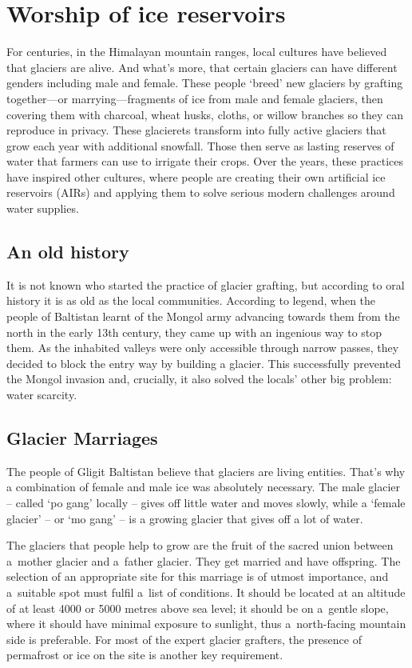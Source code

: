 \chapter{Worship of ice reservoirs}

For centuries, in the Himalayan mountain ranges, local cultures have believed that glaciers are alive. And
what’s more, that certain glaciers can have different genders including male and female. These people ‘breed’
new glaciers by grafting together—or marrying—fragments of ice from male and female glaciers, then covering them
with charcoal, wheat husks, cloths, or willow branches so they can reproduce in privacy. These glacierets
transform into fully active glaciers that grow each year with additional snowfall. Those then serve as lasting
reserves of water that farmers can use to irrigate their crops. Over the years, these practices have inspired
other cultures, where people are creating their own artificial ice reservoirs (AIRs) and applying them to solve
serious modern challenges around water supplies.

\section{An old history}

It is not known who started the practice of glacier grafting, but according to oral history it is as old as the
local communities. According to legend, when the people of Baltistan learnt of the Mongol army advancing towards
them from the north in the early 13th century, they came up with an ingenious way to stop them. As the inhabited
valleys were only accessible through narrow passes, they decided to block the entry way by building a glacier.
This successfully prevented the Mongol invasion and, crucially, it also solved the locals’ other big problem:
water scarcity.


\section{Glacier Marriages}

The people of Gligit Baltistan believe that glaciers are living entities. That’s why a combination of female and
male ice was absolutely necessary. The male glacier – called ‘po gang’ locally – gives off little water and
moves slowly, while a ‘female glacier’ – or ‘mo gang’ – is a growing glacier that gives off a lot of water.

The glaciers that people help to grow are the fruit of the sacred union between a mother glacier and a father
glacier. They get married and have offspring. The selection of an appropriate site for this marriage is of
utmost importance, and a suitable spot must fulfil a list of conditions. It should be located at an altitude of
at least 4000 or 5000 metres above sea level; it should be on a gentle slope, where it should have minimal
exposure to sunlight, thus a north-facing mountain side is preferable. For most of the expert glacier grafters,
the presence of permafrost or ice on the site is another key requirement. 

